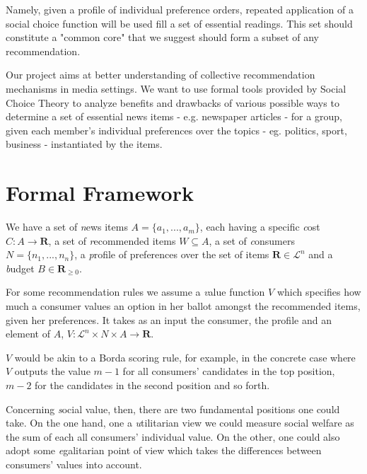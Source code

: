 \documentclass{article}
\begin{document}
 Namely, given a profile of individual preference orders, repeated application of a social choice function will be used fill a set of essential readings. This set should constitute a "common core" that we suggest should form a subset of any recommendation.

Our project aims at better understanding of collective recommendation mechanisms in media settings. We want to use formal tools provided by Social Choice Theory to analyze benefits and drawbacks of various possible ways to determine a set of essential news items - e.g. newspaper articles - for a group, given each member's individual preferences over the topics - eg. politics, sport, business - instantiated by the items.





\section{Formal Framework}\label{framework}
We have a set of {\emph news items} $A=\{a_1,...,a_m\}$, 
each having a specific {\emph cost}
 $C: A \rightarrow {\mathbf R}$,  %
a set of {\emph recommended items} $W\subseteq A$, 
a set of {\emph consumers} $N=\{n_1,...,n_n\}$, 
a {\emph profile of preferences} over the set of items $\mathbf{R}\in \mathcal{L}^n$ 
and a {\emph budget} $B\in \mathbf{R}_{\geq 0}$. %

For some recommendation rules we assume a {\emph value function} $V$ 
which specifies how much a consumer values an option in her ballot amongst the recommended items, given her preferences.
 It takes as an input the consumer, the profile and an element of $A$,
   $V: \mathcal{L}^n \times N \times  A \rightarrow \mathbf{R}$. %
 
$V$ would be akin to a Borda scoring rule, for example, in the concrete case
 where $V$ outputs the value $m-1$ for all consumers' candidates in the top position, $m-2$ for the candidates in the second position and so forth.

Concerning {\emph social value}, then, there are two fundamental positions one could take. On the one hand, one a {\emph utilitarian} view we could measure social welfare as the sum of each all consumers' individual value. On the other, one could also adopt some {\emph egalitarian} point of view which takes the differences between consumers' values into account.
\end{document}
